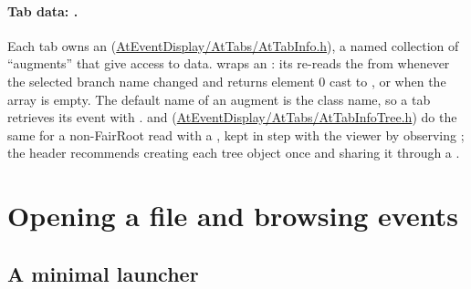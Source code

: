 \paragraph{Tab data: .} Each tab owns an 
(\url{AtEventDisplay/AtTabs/AtTabInfo.h}), a named collection of ``augments'' that give access to
data.  wraps an : its  re-reads the
 from  whenever the selected branch name changed and
returns element 0 cast to , or  when the array is empty. The default name
of an augment is the class name, so a tab retrieves its event with
.  and 
(\url{AtEventDisplay/AtTabs/AtTabInfoTree.h}) do the same for a non-FairRoot  read
with a , kept in step with the viewer by observing ; the
header recommends creating each tree object once and sharing it through a .

\section{Opening a file and browsing events}
\label{sec:vis-open}

\subsection{A minimal launcher}

